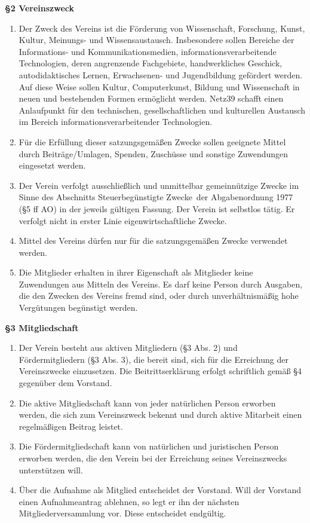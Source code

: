 \documentclass[a4paper,
               12pt,
               titlepage,
               parskip=half]{scrartcl}
\begin{document}
\textbf{§2 Vereinszweck}
{\small 
\begin{enumerate}
	\item Der Zweck des Vereins ist die Förderung von Wissenschaft, Forschung, Kunst, Kultur, Meinungs- und Wissensaustausch. Insbesondere sollen Bereiche der Informations- und Kommunikationsmedien, informationsverarbeitende Technologien, deren angrenzende Fachgebiete, handwerkliches Geschick, autodidaktisches Lernen, Erwachsenen- und Jugendbildung gefördert werden. Auf diese Weise sollen Kultur, Computerkunst, Bildung und Wissenschaft in neuen und bestehenden Formen ermöglicht werden. Netz39 schafft einen Anlaufpunkt für den technischen, gesellschaftlichen und kulturellen Austausch im Bereich informationsverarbeitender Technologien.
	\item Für die Erfüllung dieser satzungsgemäßen Zwecke sollen geeignete Mittel durch Beiträge/Umlagen, Spenden, Zuschüsse und sonstige Zuwendungen eingesetzt werden.
	\item Der Verein verfolgt ausschließlich und unmittelbar gemeinnützige Zwecke im Sinne des Abschnitts \glqq Steuerbegünstigte Zwecke\grqq\ der Abgabenordnung 1977 (§5 ff AO) in der jeweils gültigen Fassung. Der Verein ist selbstlos tätig. Er verfolgt nicht in erster Linie eigenwirtschaftliche Zwecke.
	\item Mittel des Vereins dürfen nur für die satzungsgemäßen Zwecke verwendet werden.
	\item Die Mitglieder erhalten in ihrer Eigenschaft als Mitglieder keine Zuwendungen aus Mitteln des Vereins. Es darf keine Person durch Ausgaben, die den Zwecken des Vereins fremd sind, oder durch unverhältnismäßig hohe Vergütungen begünstigt werden.
\end{enumerate}
}

\newpage

\textbf{§3 Mitgliedschaft}
{\small
\begin{enumerate}
	\item Der Verein besteht aus aktiven Mitgliedern (§3 Abs. 2) und Fördermitgliedern (§3 Abs. 3), die bereit sind, sich für die Erreichung der Vereinszwecke einzusetzen. Die Beitrittserklärung erfolgt schriftlich gemäß §4 gegenüber dem Vorstand.
	\item Die aktive Mitgliedschaft kann von jeder natürlichen Person erworben werden, die sich zum Vereinszweck bekennt und durch aktive Mitarbeit einen regelmäßigen Beitrag leistet.
	\item Die Fördermitgliedschaft kann von natürlichen und juristischen Person erworben werden, die den Verein bei der Erreichung seines Vereinszwecks unterstützen will.
	\item Über die Aufnahme als Mitglied entscheidet der Vorstand. Will der Vorstand einen Aufnahmeantrag ablehnen, so legt er ihn der nächsten Mitgliederversammlung vor. Diese entscheidet endgültig.
\end{enumerate}
}
\end{document}
